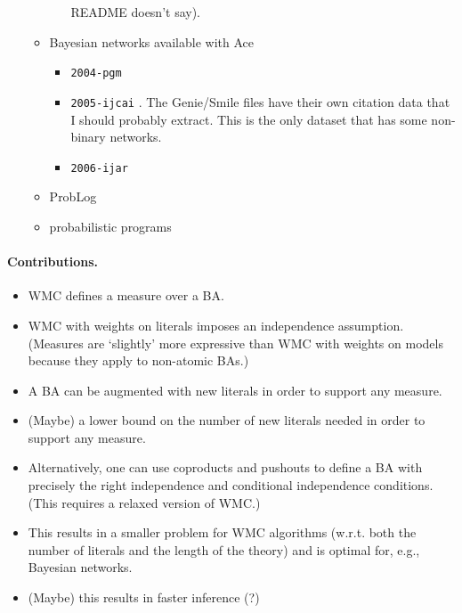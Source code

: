 \documentclass{article}
\theoremstyle{definition}
\theoremstyle{remark}
\begin{document}
\begin{itemize}
\begin{itemize}
\begin{itemize}
      README doesn't say).
    \end{itemize}
  \item Bayesian networks available with Ace
    \begin{itemize}
    \item \texttt{2004-pgm} \cite{DBLP:journals/ijar/ChaviraDJ06}
    \item \texttt{2005-ijcai} \cite{DBLP:conf/ijcai/ChaviraD05}. The Genie/Smile
      files have their own citation data that I should probably extract. This is
      the only dataset that has some non-binary networks.
    \item \texttt{2006-ijar} \cite{DBLP:journals/ijar/ChaviraDJ06}
    \end{itemize}
  \item ProbLog \cite{DBLP:conf/uai/FierensBTGR11}
  \item probabilistic programs \cite{DBLP:journals/corr/abs-2005-09089}
  \end{itemize}
\end{itemize}

\paragraph{Contributions.}
\begin{itemize}
\item WMC defines a measure over a BA.
\item WMC with weights on literals imposes an independence assumption. (Measures
  are `slightly' more expressive than WMC with weights on models because they
  apply to non-atomic BAs.)
\item A BA can be augmented with new literals in order to support any measure.
\item (Maybe) a lower bound on the number of new literals needed in order to
  support any measure.
\item Alternatively, one can use coproducts and pushouts to define a BA with
  precisely the right independence and conditional independence conditions.
  (This requires a relaxed version of WMC.)
\item This results in a smaller problem for WMC algorithms (w.r.t. both the
  number of literals and the length of the theory) and is optimal for, e.g.,
  Bayesian networks.
\item (Maybe) this results in faster inference (?)
\end{itemize}
\end{document}
